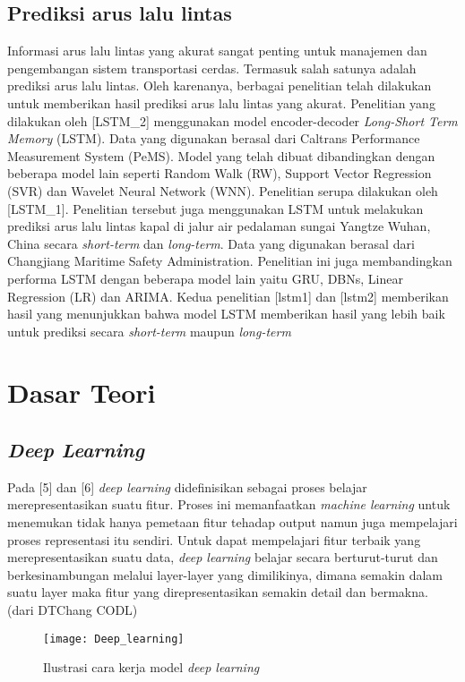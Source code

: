 \documentclass[../thesis.tex]{subfiles}
\begin{document}
\subsection{Prediksi arus lalu lintas}
Informasi arus lalu lintas yang akurat sangat penting untuk manajemen dan pengembangan sistem transportasi cerdas. Termasuk salah satunya adalah prediksi arus lalu lintas. Oleh karenanya, berbagai penelitian telah dilakukan untuk memberikan hasil prediksi arus lalu lintas yang akurat.
Penelitian yang dilakukan oleh [LSTM_2] menggunakan model encoder-decoder \textit{Long-Short Term Memory} (LSTM). Data yang digunakan berasal dari Caltrans Performance Measurement System (PeMS). Model yang telah dibuat dibandingkan dengan beberapa model lain seperti Random Walk (RW), Support Vector Regression (SVR) dan Wavelet Neural Network (WNN). 
Penelitian serupa dilakukan oleh [LSTM_1]. Penelitian tersebut juga menggunakan LSTM untuk melakukan prediksi arus lalu lintas kapal di jalur air pedalaman sungai Yangtze Wuhan, China secara \textit{short-term} dan \textit{long-term}. Data yang digunakan berasal dari Changjiang Maritime Safety Administration. Penelitian ini juga membandingkan performa LSTM dengan beberapa model lain yaitu GRU, DBNs, Linear Regression (LR) dan ARIMA.
Kedua penelitian [lstm1] dan [lstm2] memberikan hasil yang menunjukkan bahwa model LSTM memberikan hasil yang lebih baik untuk prediksi secara \textit{short-term} maupun \textit{long-term}

\section{Dasar Teori}
\subsection{\textit{Deep Learning}}
Pada [5] dan [6] \textit{deep learning} didefinisikan sebagai proses belajar merepresentasikan suatu fitur. Proses ini memanfaatkan \textit{machine learning} untuk menemukan tidak hanya pemetaan fitur tehadap output namun juga mempelajari proses representasi itu sendiri.
Untuk dapat mempelajari fitur terbaik yang merepresentasikan suatu data, \textit{deep learning} belajar secara berturut-turut dan berkesinambungan melalui layer-layer yang dimilikinya, dimana semakin dalam suatu layer maka fitur yang direpresentasikan semakin detail dan bermakna.
(dari DTChang CODL)

\begin{figure}
	\centering
	\texttt{[image: Deep\_learning]}
	\caption{Ilustrasi cara kerja model \textit{deep learning}}
	\label{Dl_model}
\end{figure}
\end{document}
